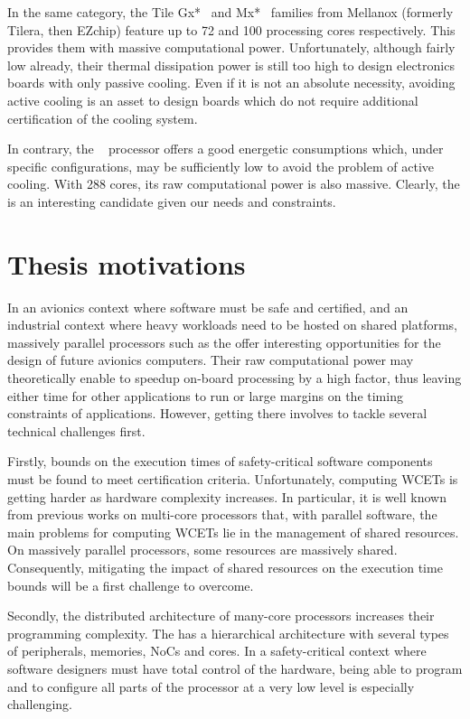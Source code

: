 \documentclass[main.tex]{subfiles}
\begin{document}
In the same category, the Tile Gx*~\cite{TileGx} and Mx*~\cite{TileMx} families from Mellanox (formerly Tilera, then EZchip) feature up to 72 and 100 processing cores respectively. This provides them with massive computational power. Unfortunately, although fairly low already, their thermal dissipation power is still too high to design electronics boards with only passive cooling. Even if it is not an absolute necessity, avoiding active cooling is an asset to design boards which do not require additional certification of the cooling system.

In contrary, the \mppalong~\cite{kalray_mppa} processor offers a good energetic consumptions which, under specific configurations, may be sufficiently low to avoid the problem of active cooling. With 288 cores, its raw computational power is also massive. Clearly, the \mppalong is an interesting candidate given our needs and constraints.


\section{Thesis motivations}
In an avionics context where software must be safe and certified, and an industrial context where heavy workloads need to be hosted on shared platforms, massively parallel processors such as the \mppalong offer interesting opportunities for the design of future avionics computers. Their raw computational power may theoretically enable to speedup on-board processing by a high factor, thus leaving either time for other applications to run or large margins on the timing constraints of applications. However, getting there involves to tackle several technical challenges first.


Firstly, bounds on the execution times of safety-critical software components must be found to meet certification criteria. Unfortunately, computing WCETs is getting harder as hardware complexity increases. In particular, it is well known from previous works on multi-core processors that, with parallel software, the main problems for computing WCETs lie in the management of shared resources. On massively parallel processors, some resources are massively shared. Consequently, mitigating the impact of shared resources on the execution time bounds will be a first challenge to overcome.

Secondly, the distributed architecture of many-core processors increases their programming complexity. The \mppalong has a hierarchical architecture with several types of peripherals, memories, NoCs and cores. In a safety-critical context where software designers must have total control of the hardware, being able to program and to configure all parts of the processor at a very low level is especially challenging.
\end{document}
